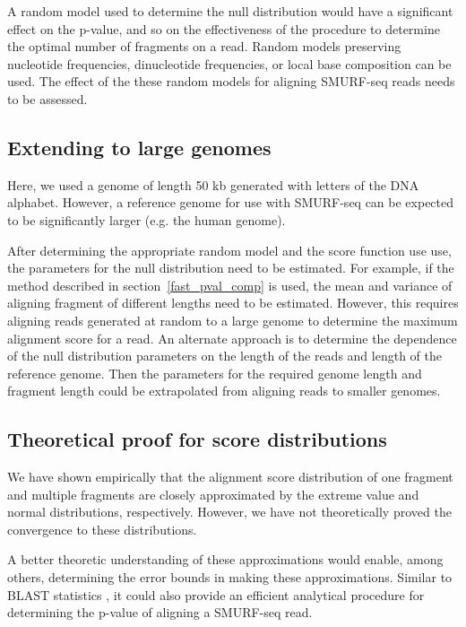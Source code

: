 A random model used to determine the null distribution would have a
significant effect on the p-value, and so on the effectiveness of the
procedure to determine the optimal number of fragments on a read. Random
models preserving nucleotide frequencies, dinucleotide frequencies, or
local base composition can be used.  The effect of the these random
models for aligning SMURF-seq reads needs to be assessed.

\subsection*{Extending to large genomes}
Here, we used a genome of length 50 kb generated with letters of the DNA
alphabet. However, a reference genome for use with SMURF-seq can be
expected to be significantly larger (e.g. the human genome).

After determining the appropriate random model and the score function
use use, the parameters for the null distribution need to be estimated.
For example, if the method described in section~\ref{fast_pval_comp} is
used, the mean and variance of aligning fragment of different lengths
need to be estimated.
%
However, this requires aligning reads generated at random to a large
genome to determine the maximum alignment score for a read.
%
An alternate approach is to determine the dependence of the null
distribution parameters on the length of the reads and length of the
reference genome. Then the parameters for the required genome length and
fragment length could be extrapolated from aligning reads to smaller
genomes.

\subsection*{Theoretical proof for score distributions}
We have shown empirically that the alignment score distribution of one
fragment and multiple fragments are closely approximated by the extreme
value and normal distributions, respectively. However, we have not
theoretically proved the convergence to these distributions.

A better theoretic understanding of these approximations would enable,
among others, determining the error bounds in making these
approximations.
%
Similar to BLAST statistics
\citep{karlin1990methods,karlin1990statistical}, it could also provide
an efficient analytical procedure for determining the p-value of
aligning a SMURF-seq read.

